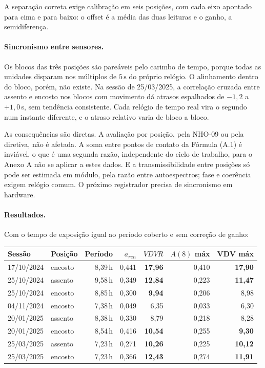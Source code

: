 \documentclass[11pt,a4paper]{article}
\newcommand{\unit}[2]{\ensuremath{#1\,\mathrm{#2}}}
\begin{document}
A separação correta exige calibração em seis posições, com cada eixo apontado
para cima e para baixo: o offset é a média das duas leituras e o ganho, a
semidiferença.

\paragraph{Sincronismo entre sensores.} Os blocos das três posições são
pareáveis pelo carimbo de tempo, porque todas as unidades disparam nos múltiplos
de \unit{5}{s} do próprio relógio. O alinhamento dentro do bloco, porém, não
existe. Na sessão de 25/03/2025, a correlação cruzada entre assento e encosto
nos blocos com movimento dá atrasos espalhados de $-1{,}2$ a $+1{,}0$\,s, sem
tendência consistente. Cada relógio de tempo real vira o segundo num instante
diferente, e o atraso relativo varia de bloco a bloco.

As consequências são diretas. A avaliação por posição, pela NHO-09 ou pela
diretiva, não é afetada. A soma entre pontos de contato da Fórmula (A.1) é
inviável, o que é uma segunda razão, independente do ciclo de trabalho, para o
Anexo A não se aplicar a estes dados. E a transmissibilidade entre posições só
pode ser estimada em módulo, pela razão entre autoespectros; fase e coerência
exigem relógio comum. O próximo registrador precisa de sincronismo em hardware.

\paragraph{Resultados.} Com o tempo de exposição igual ao período coberto e sem
correção de ganho:

\begin{center}
\small
\begin{tabular}{llrrrrr}
\toprule
Sessão & Posição & Período & $a_{ren}$ & $VDVR$ & $A(8)$ máx & VDV máx \\
\midrule
17/10/2024 & encosto & 8,39\,h & 0,441 & \textbf{17,96} & 0,410 & \textbf{17,90} \\
25/10/2024 & assento & 9,58\,h & 0,349 & \textbf{12,84} & 0,223 & \textbf{11,47} \\
25/10/2024 & encosto & 8,85\,h & 0,300 & \textbf{9,94}  & 0,206 & 8,98 \\
04/11/2024 & encosto & 7,38\,h & 0,049 & 6,35  & 0,033 & 6,30 \\
20/01/2025 & assento & 8,38\,h & 0,330 & 8,79  & 0,218 & 8,28 \\
20/01/2025 & encosto & 8,54\,h & 0,416 & \textbf{10,54} & 0,255 & \textbf{9,30} \\
25/03/2025 & assento & 7,23\,h & 0,271 & \textbf{10,26} & 0,225 & \textbf{10,12} \\
25/03/2025 & encosto & 7,23\,h & 0,366 & \textbf{12,43} & 0,274 & \textbf{11,91} \\
\bottomrule
\end{tabular}
\end{center}
\end{document}
